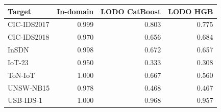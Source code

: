 \begin{tabular}{lrrr}
\toprule
Target & In-domain & LODO CatBoost & LODO HGB \\
\midrule
CIC-IDS2017 & 0.999 & 0.803 & 0.775 \\
CIC-IDS2018 & 0.970 & 0.656 & 0.684 \\
InSDN & 0.998 & 0.672 & 0.657 \\
IoT-23 & 0.950 & 0.333 & 0.308 \\
ToN-IoT & 1.000 & 0.667 & 0.560 \\
UNSW-NB15 & 0.978 & 0.468 & 0.467 \\
USB-IDS-1 & 1.000 & 0.968 & 0.957 \\
\bottomrule
\end{tabular}
